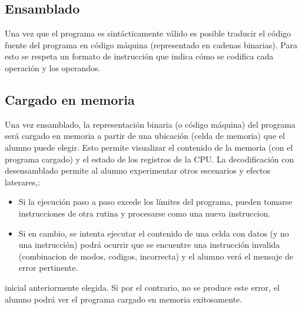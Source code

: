 \subsection{Ensamblado}

Una vez que el programa es sintácticamente válido es posible traducir el código fuente del programa en código máquina (representado en cadenas binarias). Para esto se respeta un formato de instrucción que indica cómo se codifica cada operación y los operandos. 


\subsection{Cargado en memoria}

Una vez ensamblado, la representación binaria (o código máquina) del programa será cargado en memoria a partir de una ubicación (celda de memoria) que el alumno puede elegir. Esto permite visualizar el contenido de la memoria (con el programa cargado) y el estado de los registros de la CPU. La decodificación con desensamblado permite al alumno experimentar otros escenarios y efectos laterares,:

\begin{itemize}
\item Si la ejecución paso a paso excede los límites del programa, pueden tomarse instrucciones de otra rutina y procesarse como una nueva instruccion.
\item Si en cambio, se intenta ejecutar el contenido de una celda con datos (y no una instrucción) podrá ocurrir que se encuentre una instrucción invalida (combinacion de modos, codigos, incorrecta) y el alumno verá el mensaje de error pertinente.
\end{itemize}

 inicial anteriormente elegida. Si por el contrario, no se produce este error, el alumno podrá ver el programa cargado en memoria exitosamente.

